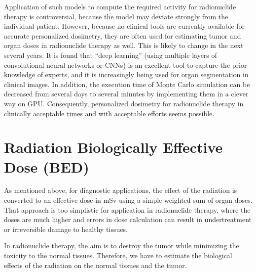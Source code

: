 \documentclass[11pt,oneside]{book}
\begin{document}
Application of such models to compute the required activity for
radionuclide therapy is controversial, because the model may deviate
strongly from the individual patient. However, because no clinical
tools are currently available for accurate personalized dosimetry,
they are often used for estimating tumor and organ doses in
radionuclide therapy as well. This is likely to change in the next
several years. It is found that ``deep learning'' (using multiple
layers of convolutional neural networks or CNNs) is an excellent tool
to capture the prior knowledge of experts, and it is increasingly
being used for organ segmentation in clinical images. In addition, the
execution time of Monte Carlo simulation can be decreased from several
days to several minutes by implementing them in a clever way on
GPU. Consequently, personalized dosimetry for radionuclide therapy in
clinically acceptable times and with acceptable efforts seems
possible.

\section{Radiation Biologically Effective Dose (BED)}
As mentioned above, for diagnostic applications, the effect of the
radiation is converted to an effective dose in mSv using a simple
weighted sum of organ doses. That approach is too simplistic for
application in radionuclide therapy, where the doses are much higher
and errors in dose calculation can result in undertreatment or
irreversible damage to healthy tissues.

In radionuclide therapy, the aim is to destroy the tumor while
minimizing the toxicity to the normal tissues. Therefore, we have to
estimate the biological effects of the radiation on the normal tissues
and the tumor.
\end{document}
